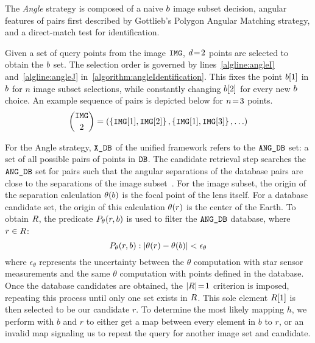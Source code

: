 The \textit{Angle} strategy is composed of a naive $b$ image subset decision, angular features of pairs first described by Gottlieb's Polygon Angular Matching strategy, and a direct-match test for identification.

Given a set of query points from the image $\texttt{IMG}$, $d \!=\! 2$ points are selected to obtain the $b$ set.
The selection order is governed by lines~\ref{algline:angleI} and~\ref{algline:angleJ} in~\autoref{algorithm:angleIdentification}.
This fixes the point $b[1]$ in $b$ for $n$ image subset selections, while constantly changing $b[2]$ for every new $b$ choice.
An example sequence of pairs is depicted below for $n \!=\! 3$ points.
\begin{equation}
    \binom{\texttt{IMG}}{2} = \left(\left\{ \texttt{IMG}[1], \texttt{IMG}[2] \right\}, \left\{ \texttt{IMG}[1],\texttt{IMG}[3] \right\}, \ldots \right)
\end{equation}

For the Angle strategy, $\texttt{X\_DB}$ of the unified framework refers to the $\texttt{ANG\_DB}$ set: a set of all possible pairs of points in $\texttt{DB}$.
The candidate retrieval step searches the $\texttt{ANG\_DB}$ set for pairs such that the angular separations of the database pairs are close to the separations of the image subset~\cite{bratt:analysisStarIdentification}.
For the image subset, the origin of the separation calculation $\theta(b)$ is the focal point of the lens itself.
For a database candidate set, the origin of this calculation $\theta(r)$ is the center of the Earth.
To obtain $R$, the predicate $P_\theta(r, b)$ is used to filter the $\texttt{ANG\_DB}$ database, where $r \in R$:
\begin{equation}\label{eq:angleRequirement}
    P_{\theta}(\candidateset, \imagesubset) : \left\lvert \theta(\candidateset) - \theta(\imagesubset)\right\rvert < \epsilon_\theta
\end{equation}
where $\epsilon_{\theta}$ represents the uncertainty between the $\theta$ computation with star
sensor measurements and the same $\theta$ computation with points defined in the database.
Once the database candidates are obtained, the $\left| R \right| \!=\! 1$ criterion is imposed, repeating this process until only one set exists in $R$.
This sole element $R[1]$ is then selected to be our candidate $r$.
To determine the most likely mapping $h$, we perform  with $b$ and $r$ to either get a map between every element in $b$ to $r$, or an invalid map signaling us to repeat the query for another image set and candidate.

